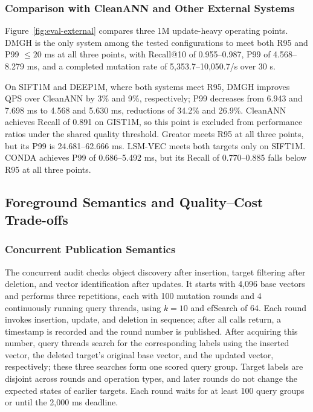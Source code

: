 \documentclass[sigconf,pbalance]{acmart}
\begin{document}
\subsubsection{Comparison with CleanANN and Other External Systems}
\label{sec:external}

Figure~\ref{fig:eval-external} compares three 1M update-heavy operating points. DMGH is the only system among the tested configurations to meet both R95 and P99 $\leq20$ ms at all three points, with Recall@10 of 0.955--0.987, P99 of 4.568--8.279 ms, and a completed mutation rate of 5,353.7--10,050.7/s over 30 s.

On SIFT1M and DEEP1M, where both systems meet R95, DMGH improves QPS over CleanANN by 3\% and 9\%, respectively; P99 decreases from 6.943 and 7.698 ms to 4.568 and 5.630 ms, reductions of 34.2\% and 26.9\%. CleanANN achieves Recall of 0.891 on GIST1M, so this point is excluded from performance ratios under the shared quality threshold. Greator meets R95 at all three points, but its P99 is 24.681--62.666 ms. LSM-VEC meets both targets only on SIFT1M. CONDA achieves P99 of 0.686--5.492 ms, but its Recall of 0.770--0.885 falls below R95 at all three points.

\subsection{Foreground Semantics and Quality--Cost Trade-offs}
\label{sec:semantics-quality}

\subsubsection{Concurrent Publication Semantics}
\label{sec:semantic-audit}

The concurrent audit checks object discovery after insertion, target filtering after deletion, and vector identification after updates. It starts with 4,096 base vectors and performs three repetitions, each with 100 mutation rounds and 4 continuously running query threads, using $k=10$ and efSearch of 64. Each round invokes insertion, update, and deletion in sequence; after all calls return, a timestamp is recorded and the round number is published. After acquiring this number, query threads search for the corresponding labels using the inserted vector, the deleted target's original base vector, and the updated vector, respectively; these three searches form one scored query group. Target labels are disjoint across rounds and operation types, and later rounds do not change the expected states of earlier targets. Each round waits for at least 100 query groups or until the 2,000 ms deadline.
\end{document}
